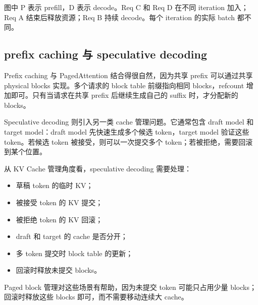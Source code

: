 图中 P 表示 prefill，D 表示 decode。Req C 和 Req D 在不同 iteration 加入；Req A 结束后释放资源；Req B 持续 decode。每个 iteration 的实际 batch 都不同。

\subsection{prefix caching 与 speculative decoding}
\label{subsec:vllm-prefix-caching-speculative-decoding}

Prefix caching 与 PagedAttention 结合得很自然，因为共享 prefix 可以通过共享 physical blocks 实现。多个请求的 block table 前缀指向相同 blocks，refcount 增加即可。只有当请求在共享 prefix 后继续生成自己的 suffix 时，才分配新的 blocks。

Speculative decoding 则引入另一类 cache 管理问题。它通常包含 draft model 和 target model：draft model 先快速生成多个候选 token，target model 验证这些 token。若候选 token 被接受，则可以一次提交多个 token；若被拒绝，需要回滚到某个位置。

从 KV Cache 管理角度看，speculative decoding 需要处理：

\begin{itemize}
\item 草稿 token 的临时 KV；
\item 被接受 token 的 KV 提交；
\item 被拒绝 token 的 KV 回滚；
\item draft 和 target 的 cache 是否分开；
\item 多 token 提交时 block table 的更新；
\item 回滚时释放未提交 blocks。
\end{itemize}

Paged block 管理对这些场景有帮助，因为未提交 token 可能只占用少量 blocks；回滚时释放这些 blocks 即可，而不需要移动连续大 cache。

